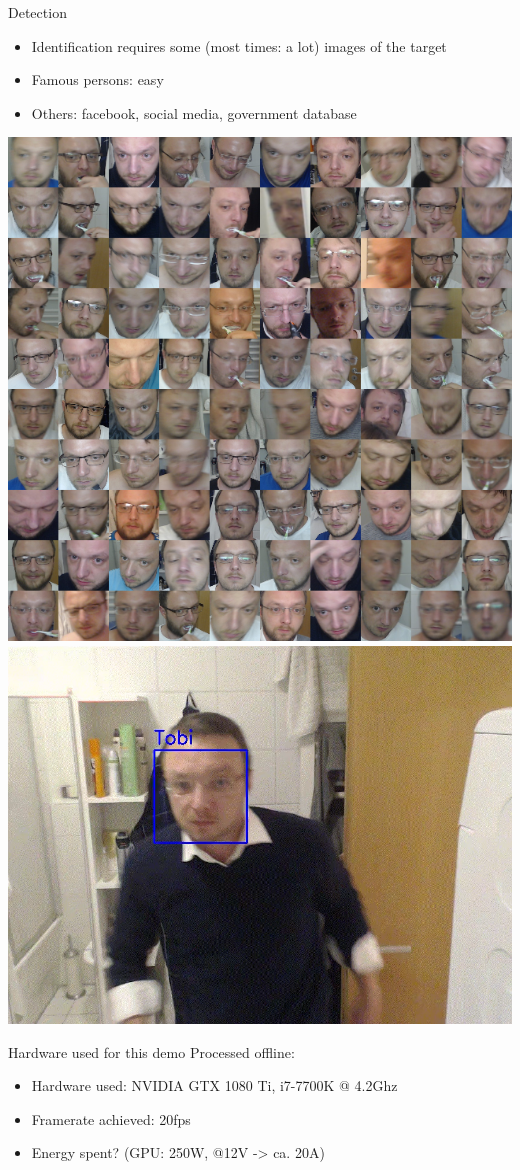 \documentclass[aspectratio=169]{beamer}
\begin{document}
\begin{frame}{Detection}
	\begin{itemize}
		\item Identification requires some (most times: a lot) images of the target
		\item Famous persons: easy
		\item Others: facebook, social media, government database
	\end{itemize}
	\includegraphics[width=.35\textwidth]{images/mosaic_tobi.png}
	\hspace{1cm}
    \href{run:./videos/face_recog_new.mp4?autostart}
    {\includegraphics[width=.49\linewidth]{images/face_recog.png}}	
\end{frame}

\begin{frame}{Hardware used for this demo}
	Processed offline:
	\begin{itemize}
		\item Hardware used: NVIDIA GTX 1080 Ti, i7-7700K @ 4.2Ghz
		\item Framerate achieved: 20fps
		\item Energy spent? (GPU: 250W, @12V -> ca. 20A)
	\end{itemize}
\end{frame}
\end{document}
